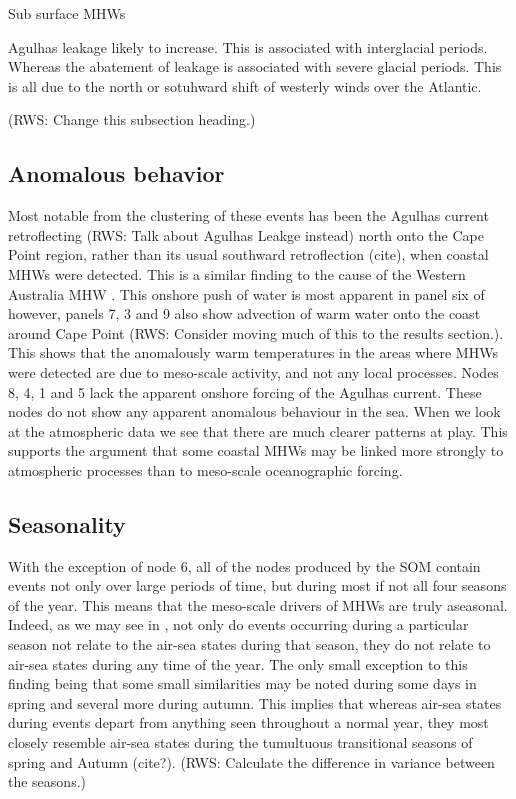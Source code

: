 \documentclass[a4paper,10pt,review]{elsarticle}
\begin{document}
\citet{Schaeffer2017} Sub surface MHWs

\citet{Beal2011} Agulhas leakage likely to increase. This is associated with interglacial periods. Whereas the abatement of leakage is associated with severe glacial periods. This is all due to the north or sotuhward shift of westerly winds over the Atlantic.

(RWS: Change this subsection heading.)
\subsection{Anomalous behavior}
Most notable from the clustering of these events has been the Agulhas current retroflecting (RWS: Talk about Agulhas Leakge instead) north onto the Cape Point region, rather than its usual southward retroflection (cite), when coastal MHWs were detected. This is a similar finding to the cause of the Western Australia MHW \citep{Feng2013, Benthuysen2014}. This onshore push of water is most apparent in panel six of  however, panels 7, 3 and 9 also show advection of warm water onto the coast around Cape Point (RWS: Consider moving much of this to the results section.). This shows that the anomalously warm temperatures in the areas where MHWs were detected are due to meso-scale activity, and not any local processes. Nodes 8, 4, 1 and 5 lack the apparent onshore forcing of the Agulhas current. These nodes do not show any apparent anomalous behaviour in the sea. When we look at the atmospheric data we see that there are much clearer patterns at play. This supports the argument that some coastal MHWs may be linked more strongly to atmospheric processes than to meso-scale oceanographic forcing.

\subsection{Seasonality}
With the exception of node 6, all of the nodes produced by the SOM contain events not only over large periods of time, but during most if not all four seasons of the year. This means that the meso-scale drivers of MHWs are truly aseasonal. Indeed, as we may see in , not only do events occurring during a particular season not relate to the air-sea states during that season, they do not relate to air-sea states during any time of the year. The only small exception to this finding being that some small similarities may be noted during some days in spring and several more during autumn. This implies that whereas air-sea states during events depart from anything seen throughout a normal year, they most closely resemble air-sea states during the tumultuous transitional seasons of spring and Autumn (cite?). (RWS: Calculate the difference in variance between the seasons.)
\end{document}
